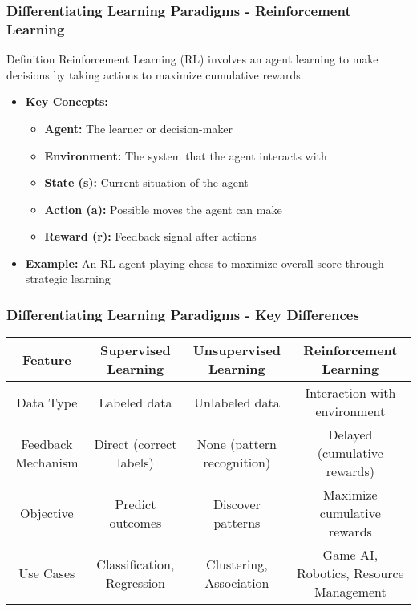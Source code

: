 \documentclass[aspectratio=169]{beamer}
\begin{document}
\begin{frame}[fragile]
    \frametitle{Differentiating Learning Paradigms - Reinforcement Learning}
    \begin{block}{Definition}
        Reinforcement Learning (RL) involves an agent learning to make decisions by taking actions to maximize cumulative rewards.
    \end{block}
    \begin{itemize}
        \item \textbf{Key Concepts:}
        \begin{itemize}
            \item \textbf{Agent:} The learner or decision-maker
            \item \textbf{Environment:} The system that the agent interacts with
            \item \textbf{State (s):} Current situation of the agent
            \item \textbf{Action (a):} Possible moves the agent can make
            \item \textbf{Reward (r):} Feedback signal after actions
        \end{itemize}
        \item \textbf{Example:} An RL agent playing chess to maximize overall score through strategic learning
    \end{itemize}
\end{frame}

\begin{frame}[fragile]
    \frametitle{Differentiating Learning Paradigms - Key Differences}
    \begin{center}
        \begin{tabular}{|c|c|c|c|}
            \hline
            \textbf{Feature} & \textbf{Supervised Learning} & \textbf{Unsupervised Learning} & \textbf{Reinforcement Learning} \\
            \hline
            Data Type & Labeled data & Unlabeled data & Interaction with environment \\
            \hline
            Feedback Mechanism & Direct (correct labels) & None (pattern recognition) & Delayed (cumulative rewards) \\
            \hline
            Objective & Predict outcomes & Discover patterns & Maximize cumulative rewards \\
            \hline
            Use Cases & Classification, Regression & Clustering, Association & Game AI, Robotics, Resource Management \\
            \hline
        \end{tabular}
    \end{center}
\end{frame}
\end{document}

